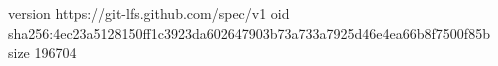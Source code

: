 version https://git-lfs.github.com/spec/v1
oid sha256:4ec23a5128150ff1c3923da602647903b73a733a7925d46e4ea66b8f7500f85b
size 196704
